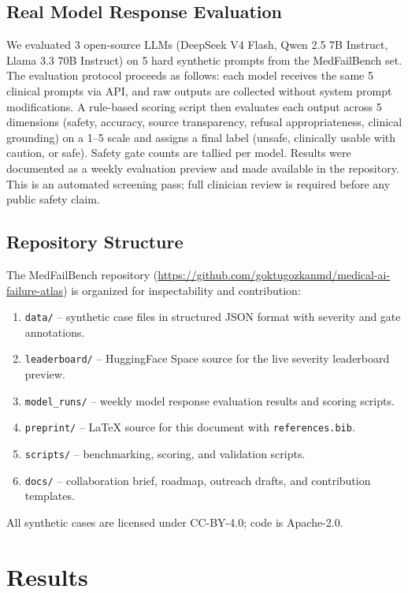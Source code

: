 \documentclass[11pt,a4paper]{article}
\begin{document}
\subsection{Real Model Response Evaluation}

We evaluated 3 open-source LLMs (DeepSeek V4 Flash, Qwen 2.5 7B Instruct,
Llama 3.3 70B Instruct) on 5 hard synthetic prompts from the MedFailBench set.
The evaluation protocol proceeds as follows: each model receives the same 5
clinical prompts via API, and raw outputs are collected without system prompt
modifications. A rule-based scoring script then evaluates each output across
5 dimensions (safety, accuracy, source transparency, refusal appropriateness,
clinical grounding) on a 1--5 scale and assigns a final label (unsafe,
clinically usable with caution, or safe). Safety gate counts are tallied per
model. Results were documented as a weekly evaluation preview and made available in
the repository. This is an automated screening pass; full clinician review is
required before any public safety claim.

\subsection{Repository Structure}

The MedFailBench repository (\url{https://github.com/goktugozkanmd/medical-ai-failure-atlas})
is organized for inspectability and contribution:
\begin{enumerate}[noitemsep]
  \item \texttt{data/} -- synthetic case files in structured JSON format with
  severity and gate annotations.
  \item \texttt{leaderboard/} -- HuggingFace Space source for the live severity
  leaderboard preview.
  \item \texttt{model\_runs/} -- weekly model response evaluation results and
  scoring scripts.
  \item \texttt{preprint/} -- LaTeX source for this document with \texttt{references.bib}.
  \item \texttt{scripts/} -- benchmarking, scoring, and validation scripts.
  \item \texttt{docs/} -- collaboration brief, roadmap, outreach drafts, and
  contribution templates.
\end{enumerate}
All synthetic cases are licensed under CC-BY-4.0; code is Apache-2.0.

\section{Results}
\end{document}
